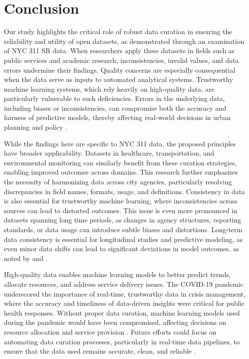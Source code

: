 \documentclass[linenumber]{jdsart}
\begin{document}
\section{Conclusion} 
\label{sec:conclusion}
Our study highlights the critical role of robust data curation in
ensuring the reliability and utility of open datasets, as demonstrated
through an examination of NYC 311 SR data. When researchers apply 
these datasets in fields such as public services and academic research, 
inconsistencies, invalid values, and data errors undermine their 
findings. Quality concerns are especially consequential when the 
data serve as inputs to automated analytical systems. Trustworthy 
machine learning systems, which rely heavily on high-quality data, 
are particularly vulnerable to such deficiencies. Errors in the underlying data,
including biases or inconsistencies, can compromise both the accuracy
and fairness of predictive models, thereby affecting real-world
decisions in urban planning and policy \citep{rahm2000data, geiger2020garbage}.


While the findings here are specific to NYC 311 data, the proposed principles 
have broader applicability. Datasets in healthcare, 
transportation, and environmental monitoring can similarly benefit 
from these curation strategies, enabling improved outcomes across 
domains. This research further emphasizes the 
necessity of harmonizing data across city agencies, 
particularly resolving discrepancies in field
names, formats, usage, and definitions. Consistency in data is also 
essential for trustworthy machine learning, where 
inconsistencies across sources can lead to distorted 
outcomes. This issue is even more pronounced in 
datasets spanning long time periods, as changes in agency 
structures, reporting standards, or data usage can introduce 
subtle biases and distortions. Long-term data consistency 
is essential for longitudinal studies and predictive modeling, 
as even minor data shifts can lead to significant deviations 
in model outcomes, as noted by \citet{rahm2000data} 
and \citet{borgman2012conundrum}.

High-quality data enables machine learning models to better predict
trends, allocate resources, and address service delivery issues. The 
COVID-19 pandemic underscored the importance of 
real-time, trustworthy data in crisis management, where the 
accuracy and timeliness of data-driven insights were critical 
for public health responses. Without proper data curation, machine 
learning models used during the pandemic would have been 
compromised, affecting decisions on resource allocation and
service provision \citep{worby2020face, khemasuwan2021applications}.
Future efforts could focus on automating data curation processes, 
particularly in real-time data pipelines, to ensure that the data used
remains accurate, clean, and reliable
\citep{chu2016data, hurbean2021open}.
\end{document}
